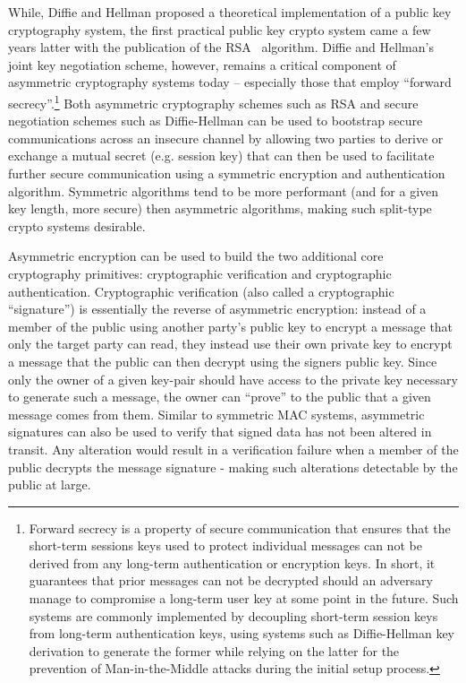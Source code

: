 While, Diffie and Hellman proposed a theoretical implementation of a
public key cryptography system, the first practical public key crypto
system came a few years latter with the publication of the
RSA~\cite{rivest1978} algorithm. Diffie and Hellman's joint key
negotiation scheme, however, remains a critical component of
asymmetric cryptography systems today -- especially those that employ
``forward secrecy''.\footnote{Forward secrecy is a property of secure
  communication that ensures that the short-term sessions keys used to
  protect individual messages can not be derived from any long-term
  authentication or encryption keys. In short, it guarantees that
  prior messages can not be decrypted should an adversary manage to
  compromise a long-term user key at some point in the future. Such
  systems are commonly implemented by decoupling short-term session
  keys from long-term authentication keys, using systems such as
  Diffie-Hellman key derivation to generate the former while relying
  on the latter for the prevention of Man-in-the-Middle attacks during
  the initial setup process.} Both asymmetric cryptography schemes
such as RSA and secure negotiation schemes such as Diffie-Hellman can
be used to bootstrap secure communications across an insecure channel
by allowing two parties to derive or exchange a mutual secret
(e.g. session key) that can then be used to facilitate further secure
communication using a symmetric encryption and authentication
algorithm. Symmetric algorithms tend to be more performant (and for a
given key length, more secure) then asymmetric algorithms, making such
split-type crypto systems desirable.

Asymmetric encryption can be used to build the two additional core
cryptography primitives: cryptographic verification and cryptographic
authentication. Cryptographic verification (also called a
cryptographic ``signature'') is essentially the reverse of asymmetric
encryption: instead of a member of the public using another party's
public key to encrypt a message that only the target party can read,
they instead use their own private key to encrypt a message that the
public can then decrypt using the signers public key. Since only the
owner of a given key-pair should have access to the private key
necessary to generate such a message, the owner can ``prove'' to the
public that a given message comes from them. Similar to symmetric MAC
systems, asymmetric signatures can also be used to verify that signed
data has not been altered in transit. Any alteration would result in a
verification failure when a member of the public decrypts the message
signature - making such alterations detectable by the public at large.

